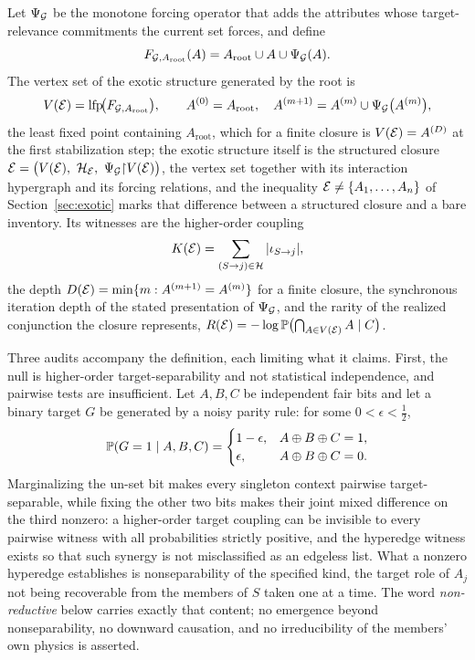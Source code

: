 \begin{definition}
Let $\Psi_{\mathcal{G}}$ be the monotone forcing operator that adds the
attributes whose target-relevance commitments the current set forces,
and define
\[
F_{\mathcal{G},A_{\mathrm{root}}}(A)
=A_{\mathrm{root}}\cup A\cup\Psi_{\mathcal{G}}(A).
\]
The vertex set of the exotic structure generated by the root is
\[
V(\mathcal{E})=\operatorname{lfp}\!\bigl(F_{\mathcal{G},A_{\mathrm{root}}}\bigr),
\qquad
A^{(0)}=A_{\mathrm{root}},\quad
A^{(m+1)}=A^{(m)}\cup\Psi_{\mathcal{G}}\bigl(A^{(m)}\bigr),
\]
the least fixed point containing $A_{\mathrm{root}}$, which for a finite
closure is $V(\mathcal{E})=A^{(D)}$ at the first stabilization step; the exotic
structure itself is the structured closure
$\Ec=\bigl(V(\Ec),\ \mathcal H_{\Ec},\ \Psi_{\Gc}{\restriction}V(\Ec)\bigr)$,
the vertex set together with its interaction hypergraph and its forcing
relations, and the inequality $\mathcal{E}\neq\{A_1,\dots,A_n\}$ of
Section~\ref{sec:exotic} marks that difference between a structured closure
and a bare inventory. Its witnesses are the higher-order coupling
\[
K(\mathcal{E})=\sum_{(S\to j)\in\mathcal H}|\iota_{S\to j}|,
\]
the depth
$D(\mathcal{E})=\min\{m:A^{(m+1)}=A^{(m)}\}$ for a finite closure, the
synchronous iteration depth of the stated presentation of $\Psi_{\mathcal{G}}$, and
the rarity of the realized conjunction the closure represents,
$R(\mathcal{E})=-\log\mathbb{P}\bigl(\bigcap_{A\in V(\mathcal{E})}A\mid C\bigr)$.
\end{definition}

\noindent Three audits accompany the definition, each limiting what it
claims. First, the null is higher-order target-separability and not
statistical independence, and pairwise tests are insufficient. Let $A,B,C$ be
independent fair bits and let a binary target $G$ be generated by a noisy
parity rule: for some $0<\epsilon<\tfrac12$,
\[
\mathbb{P}(G=1\mid A,B,C)=
\begin{cases}
1-\epsilon,&A\oplus B\oplus C=1,\\
\epsilon,&A\oplus B\oplus C=0.
\end{cases}
\]
Marginalizing the un-set bit makes every singleton context pairwise
target-separable, while fixing the other two bits makes their joint mixed
difference on the third nonzero: a higher-order target coupling can be
invisible to every pairwise witness with all probabilities strictly positive,
and the hyperedge witness exists so that such synergy is not misclassified as
an edgeless list. What a nonzero hyperedge establishes is nonseparability of
the specified kind, the target role of $A_j$ not being recoverable from the
members of $S$ taken one at a time. The word \emph{non-reductive} below
carries exactly that content; no emergence beyond nonseparability, no downward
causation, and no irreducibility of the members' own physics is asserted.

